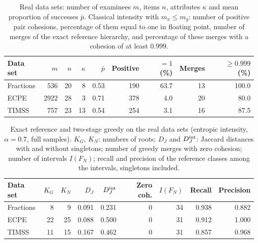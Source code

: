 \begin{table}[htbp]
	\centering
	\caption{Real data sets: number of examinees $m$, items $n$, attributes $\kappa$ and mean proportion of successes $\bar p$. Classical intensity with $m_x\leq m_y$: number of positive pair cohesions, percentage of them equal to one in floating point, number of merges of the exact reference hierarchy, and percentage of these merges with a cohesion of at least $0.999$.}\label{tab:realdata}
	\small
	\setlength{\tabcolsep}{4pt}
	\begin{tabular}{lrrrrrrrr}\toprule
		Data set & $m$ & $n$ & $\kappa$ & $\bar p$ & Positive & $=1$ (\%) & Merges & $\geq0.999$ (\%)\\\midrule
		Fractions & 536 & 20 & 8 & 0.53 & 190 & 63.7 & 13 & 100.0\\
		ECPE & 2922 & 28 & 3 & 0.71 & 378 & 4.0 & 20 & 80.0\\
		TIMSS & 757 & 23 & 13 & 0.54 & 254 & 3.1 & 16 & 87.5\\
		\bottomrule
	\end{tabular}
\end{table}

\begin{table}[htbp]
	\centering
	\caption{Exact reference and two-stage greedy on the real data sets (entropic intensity, $\alpha=0.7$, full samples). $K_G$, $K_N$: numbers of roots; $D_J$ and $D_J^{\rm int}$: Jaccard distances with and without singletons; number of greedy merges with zero cohesion; number of intervals $I(F_N)$; recall and precision of the reference classes among the intervals, singletons included.}\label{tab:realfidelity}
	\small
	\setlength{\tabcolsep}{4pt}
	\begin{tabular}{lrrrrrrrr}\toprule
		Data set & $K_G$ & $K_N$ & $D_J$ & $D_J^{\rm int}$ & Zero coh. & $I(F_N)$ & Recall & Precision\\\midrule
		Fractions & 8 & 9 & 0.091 & 0.231 & 0 & 34 & 0.938 & 0.882\\
		ECPE & 22 & 25 & 0.088 & 0.500 & 0 & 31 & 0.912 & 1.000\\
		TIMSS & 11 & 15 & 0.167 & 0.462 & 0 & 31 & 0.857 & 0.968\\
		\bottomrule
	\end{tabular}
\end{table}

